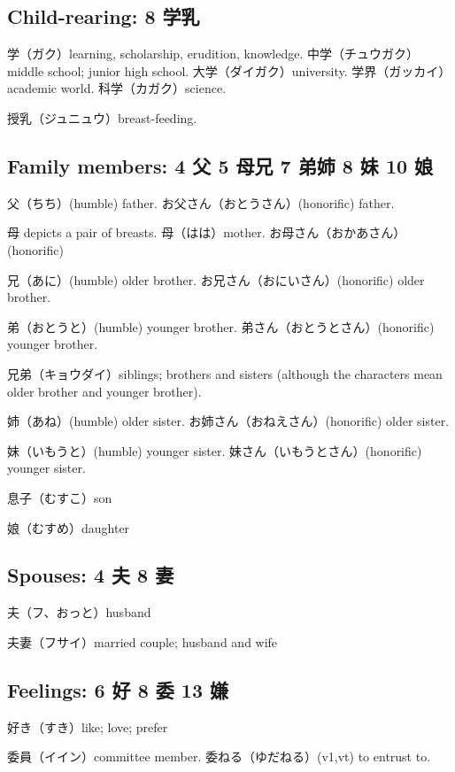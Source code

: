 \subsection{Child-rearing: 8 学乳}

学（ガク）learning, scholarship, erudition, knowledge.
中学（チュウガク）middle school; junior high school.
大学（ダイガク）university.
学界（ガッカイ）academic world.
科学（カガク）science.

授乳（ジュニュウ）breast-feeding.

\subsection{Family members: 4 父 5 母兄 7 弟姉 8 妹 10 娘}

父（ちち）(humble) father.
お父さん（おとうさん）(honorific) father.

母 depicts a pair of breasts.
母（はは）mother.
お母さん（おかあさん）(honorific)

兄（あに）(humble) older brother.
お兄さん（おにいさん）(honorific) older brother.

弟（おとうと）(humble) younger brother.
弟さん（おとうとさん）(honorific) younger brother.

兄弟（キョウダイ）siblings;
brothers and sisters
(although the characters mean older brother and younger brother).

姉（あね）(humble) older sister.
お姉さん（おねえさん）(honorific) older sister.

妹（いもうと）(humble) younger sister.
妹さん（いもうとさん）(honorific) younger sister.

息子（むすこ）son

娘（むすめ）daughter

\subsection{Spouses: 4 夫 8 妻}

夫（フ、おっと）husband

夫妻（フサイ）married couple; husband and wife

\subsection{Feelings: 6 好 8 委 13 嫌}

好き（すき）like; love; prefer

委員（イイン）committee member.
委ねる（ゆだねる）(v1,vt) to entrust to.

